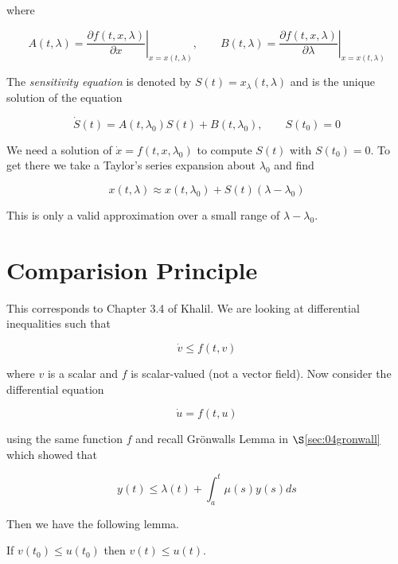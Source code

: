 where

\begin{equation*}
A(t,\lambda) = \left.\frac{\partial f(t,x,\lambda)}{\partial x}\right|_{x=x(t,\lambda)}, \qquad B(t,\lambda) = \left.\frac{\partial f(t,x,\lambda)}{\partial\lambda}\right|_{x=x(t,\lambda)}
\end{equation*}


The \textit{sensitivity equation} is denoted by $S(t) = x_\lambda(t,\lambda)$ and is the unique solution of the equation

\begin{equation*}
\dot{S}(t) = A(t,\lambda_0)S(t) + B(t,\lambda_0), \qquad S(t_0) = 0
\end{equation*}

We need a solution of $\dot{x}=f(t,x,\lambda_0)$ to compute $S(t)$ with $S(t_0)=0$.
To get there we take a Taylor's series expansion about $\lambda_0$ and find

\begin{equation*}
x(t,\lambda) \approx x(t,\lambda_0) + S(t)(\lambda-\lambda_0)
\end{equation*}

This is only a valid approximation over a small range of $\lambda-\lambda_0$.

\section{Comparision Principle}
This corresponds to Chapter 3.4 of Khalil.
We are looking at differential inequalities such that

\begin{equation*}
\dot{v}\leq f(t,v)
\end{equation*}

where $v$ is a scalar and $f$ is scalar-valued (not a vector field).
Now consider the differential equation

\begin{equation*}
\dot{u} = f(t,u)
\end{equation*}

using the same function $f$ and recall Gr\"onwalls Lemma in $\S$\ref{sec:04gronwall} which showed that

\begin{equation*}
y(t) \leq \lambda(t) + \int_a^t\mu(s)y(s)ds
\end{equation*}

Then we have the following lemma.

\begin{lemma}
If $v(t_0)\leq u(t_0)$ then $v(t)\leq u(t)$.
\end{lemma}

